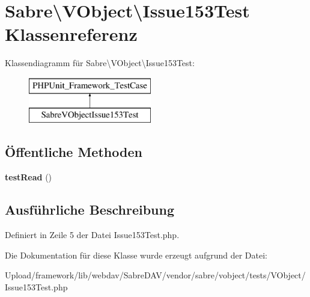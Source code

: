 \hypertarget{class_sabre_1_1_v_object_1_1_issue153_test}{}\section{Sabre\textbackslash{}V\+Object\textbackslash{}Issue153\+Test Klassenreferenz}
\label{class_sabre_1_1_v_object_1_1_issue153_test}
Klassendiagramm für Sabre\textbackslash{}V\+Object\textbackslash{}Issue153\+Test\+:\begin{figure}[H]
\begin{center}
\leavevmode
\includegraphics[height=2.000000cm]{class_sabre_1_1_v_object_1_1_issue153_test}
\end{center}
\end{figure}
\subsection*{Öffentliche Methoden}
\begin{DoxyCompactItemize}
\item 
\mbox{\label{class_sabre_1_1_v_object_1_1_issue153_test_a405053291d2a4a9428bc61ed39ed0407}} 
{\bfseries test\+Read} ()
\end{DoxyCompactItemize}


\subsection{Ausführliche Beschreibung}


Definiert in Zeile 5 der Datei Issue153\+Test.\+php.



Die Dokumentation für diese Klasse wurde erzeugt aufgrund der Datei\+:\begin{DoxyCompactItemize}
\item 
Upload/framework/lib/webdav/\+Sabre\+D\+A\+V/vendor/sabre/vobject/tests/\+V\+Object/Issue153\+Test.\+php\end{DoxyCompactItemize}
